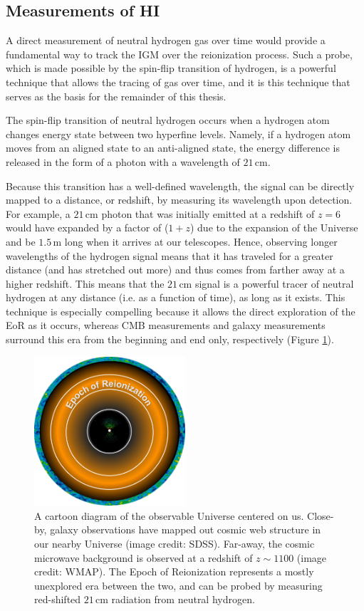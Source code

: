 \subsection{Measurements of HI}

A direct measurement of neutral hydrogen gas over time would provide a fundamental way to track the IGM over the reionization process. Such a probe, which is made possible by the spin-flip transition of hydrogen, is a powerful technique that allows the tracing of gas over time, and it is this technique that serves as the basis for the remainder of this thesis. 

The spin-flip transition of neutral hydrogen occurs when a hydrogen atom changes energy state between two hyperfine levels. Namely, if a hydrogen atom moves from an aligned state to an anti-aligned state, the energy difference is released in the form of a photon with a wavelength of $21$\,cm. 

Because this transition has a well-defined wavelength, the signal can be directly mapped to a distance, or redshift, by measuring its wavelength upon detection. For example, a $21$\,cm photon that was initially emitted at a redshift of $z = 6$ would have expanded by a factor of ($1+z$) due to the expansion of the Universe and be $1.5$\,m long when it arrives at our telescopes. Hence, observing longer wavelengths of the hydrogen signal means that it has traveled for a greater distance (and has stretched out more) and thus comes from farther away at a higher redshift. This means that the $21$\,cm signal is a powerful tracer of 
neutral hydrogen at any distance (i.e. as a function of time), as long as it exists. This technique is especially compelling because it allows the direct exploration of the EoR as it occurs, whereas CMB measurements and galaxy measurements surround this era from the beginning and end only, respectively (Figure \ref{fig:timeline_circle}).

\begin{figure}
	\centering
	\includegraphics[width=0.5\textwidth]{plots/timeline_circle.pdf}
	\caption{A cartoon diagram of the observable Universe centered on us. Close-by, galaxy observations have mapped out cosmic web structure in our nearby Universe (image credit: SDSS). Far-away, the cosmic microwave background is observed at a redshift of $z \sim 1100$ (image credit: WMAP). The Epoch of Reionization represents a mostly unexplored era between the two, and can be probed by measuring red-shifted $21$\,cm radiation from neutral hydrogen.}
	\label{fig:timeline_circle}
\end{figure}

